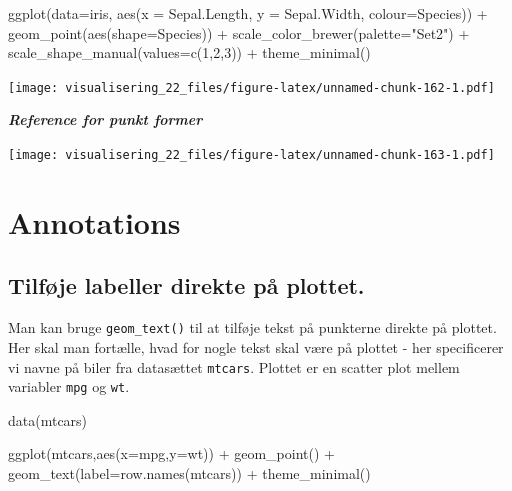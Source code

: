\documentclass[
]{book}
\newenvironment{Shaded}{\begin{snugshade}}{\end{snugshade}}
\newcommand{\AttributeTok}[1]{\textcolor[rgb]{0.77,0.63,0.00}{#1}}
\newcommand{\DecValTok}[1]{\textcolor[rgb]{0.00,0.00,0.81}{#1}}
\newcommand{\FunctionTok}[1]{\textcolor[rgb]{0.00,0.00,0.00}{#1}}
\newcommand{\NormalTok}[1]{#1}
\newcommand{\SpecialCharTok}[1]{\textcolor[rgb]{0.00,0.00,0.00}{#1}}
\newcommand{\StringTok}[1]{\textcolor[rgb]{0.31,0.60,0.02}{#1}}
\begin{document}
\begin{Shaded}
\begin{Highlighting}[]
\FunctionTok{ggplot}\NormalTok{(}\AttributeTok{data=}\NormalTok{iris, }\FunctionTok{aes}\NormalTok{(}\AttributeTok{x =}\NormalTok{ Sepal.Length, }\AttributeTok{y =}\NormalTok{ Sepal.Width, }\AttributeTok{colour=}\NormalTok{Species)) }\SpecialCharTok{+}
  \FunctionTok{geom\_point}\NormalTok{(}\FunctionTok{aes}\NormalTok{(}\AttributeTok{shape=}\NormalTok{Species)) }\SpecialCharTok{+} 
  \FunctionTok{scale\_color\_brewer}\NormalTok{(}\AttributeTok{palette=}\StringTok{"Set2"}\NormalTok{) }\SpecialCharTok{+}
  \FunctionTok{scale\_shape\_manual}\NormalTok{(}\AttributeTok{values=}\FunctionTok{c}\NormalTok{(}\DecValTok{1}\NormalTok{,}\DecValTok{2}\NormalTok{,}\DecValTok{3}\NormalTok{)) }\SpecialCharTok{+}
  \FunctionTok{theme\_minimal}\NormalTok{()}
\end{Highlighting}
\end{Shaded}

\texttt{[image: visualisering\_22\_files/figure-latex/unnamed-chunk-162-1.pdf]}

\textbf{\emph{Reference for punkt former}}

\texttt{[image: visualisering\_22\_files/figure-latex/unnamed-chunk-163-1.pdf]}

\hypertarget{annotations}{%
\section{Annotations}\label{annotations}}

\hypertarget{tilfuxf8je-labeller-direkte-puxe5-plottet.}{%
\subsection{Tilføje labeller direkte på plottet.}\label{tilfuxf8je-labeller-direkte-puxe5-plottet.}}

Man kan bruge \texttt{geom\_text()} til at tilføje tekst på punkterne direkte på plottet. Her skal man fortælle, hvad for nogle tekst skal være på plottet - her specificerer vi navne på biler fra datasættet \texttt{mtcars}. Plottet er en scatter plot mellem variabler \texttt{mpg} og \texttt{wt}.

\begin{Shaded}
\begin{Highlighting}[]
\FunctionTok{data}\NormalTok{(mtcars)}

\FunctionTok{ggplot}\NormalTok{(mtcars,}\FunctionTok{aes}\NormalTok{(}\AttributeTok{x=}\NormalTok{mpg,}\AttributeTok{y=}\NormalTok{wt)) }\SpecialCharTok{+} 
  \FunctionTok{geom\_point}\NormalTok{() }\SpecialCharTok{+}
  \FunctionTok{geom\_text}\NormalTok{(}\AttributeTok{label=}\FunctionTok{row.names}\NormalTok{(mtcars)) }\SpecialCharTok{+} 
  \FunctionTok{theme\_minimal}\NormalTok{()}
\end{Highlighting}
\end{Shaded}
\end{document}
